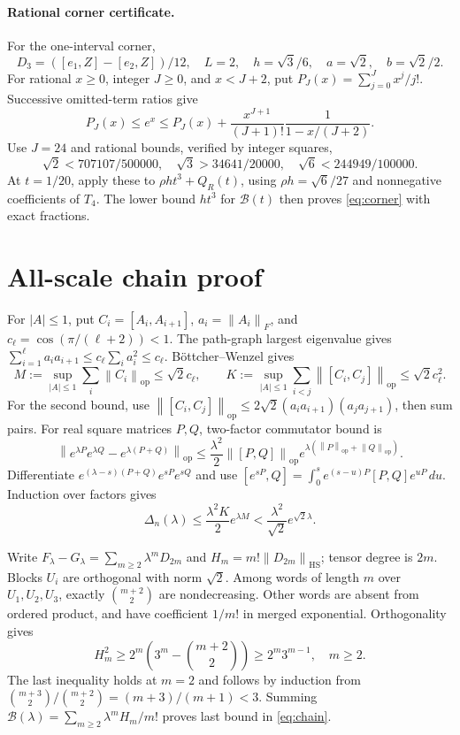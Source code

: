 \documentclass[11pt,a4paper]{article}
\newcommand{\HS}{\mathrm{HS}}
\newcommand{\op}{\mathrm{op}}
\newcommand{\B}{\mathcal B}
\newcommand{\Del}{\Delta}
\newcommand{\norm}[1]{\left\lVert#1\right\rVert}
\begin{document}
\paragraph{Rational corner certificate.}
For the one-interval corner,
\[
 D_3=([e_1,Z]-[e_2,Z])/12,\quad
 L=2,\quad h=\sqrt3/6,\quad a=\sqrt2,\quad b=\sqrt2/2.
\]
For rational \(x\ge0\), integer \(J\ge0\), and \(x<J+2\), put
\(P_J(x)=\sum_{j=0}^Jx^j/j!\). Successive omitted-term ratios give
\[
 P_J(x)\le e^x\le P_J(x)
 +\frac{x^{J+1}}{(J+1)!}\frac1{1-x/(J+2)}.
\]
Use \(J=24\) and rational bounds, verified by integer squares,
\[
 \sqrt2<707107/500000,\quad
 \sqrt3>34641/20000,\quad\sqrt6<244949/100000.
\]
At \(t=1/20\), apply these to \(\rho ht^3+Q_R(t)\), using
\(\rho h=\sqrt6/27\) and nonnegative coefficients of \(T_4\).
The lower bound \(ht^3\) for \(\B(t)\) then proves \eqref{eq:corner}
with exact fractions.

\section{All-scale chain proof}\label{app:chain}
For \(|A|\le1\), put \(C_i=[A_i,A_{i+1}]\),
\(a_i=\norm{A_i}_F\), and \(c_\ell=\cos(\pi/(\ell+2))<1\).
The path-graph largest eigenvalue gives
\(\sum_{i=1}^\ell a_i a_{i+1}\le c_\ell\sum_i a_i^2\le c_\ell\).
B\"ottcher--Wenzel gives
\[
 M:=\sup_{|A|\le1}\sum_i\norm{C_i}_{\op}\le\sqrt2c_\ell,
 \qquad
 K:=\sup_{|A|\le1}\sum_{i<j}\norm{[C_i,C_j]}_{\op}
 \le\sqrt2c_\ell^2.
\]
For the second bound, use
\(\norm{[C_i,C_j]}_{\op}\le2\sqrt2
 (a_i a_{i+1})(a_j a_{j+1})\), then sum pairs.
For real square matrices \(P,Q\), two-factor commutator bound
\cite{iserles2024elementary} is
\[
 \norm{e^{\lambda P}e^{\lambda Q}-e^{\lambda(P+Q)}}_{\op}
 \le\frac{\lambda^2}{2}\norm{[P,Q]}_{\op}
 e^{\lambda(\norm{P}_{\op}+\norm{Q}_{\op})}.
\]
Differentiate \(e^{(\lambda-s)(P+Q)}e^{sP}e^{sQ}\) and use
\([e^{sP},Q]=\int_0^s e^{(s-u)P}[P,Q]e^{uP}\,du\).
Induction over factors gives
\[
 \Del_n(\lambda)\le\frac{\lambda^2K}{2}e^{\lambda M}
 <\frac{\lambda^2}{\sqrt2}e^{\sqrt2\lambda}.
\]

Write \(F_\lambda-G_\lambda=\sum_{m\ge2}\lambda^mD_{2m}\) and
\(H_m=m!\norm{D_{2m}}_{\HS}\); tensor degree is \(2m\).
Blocks \(U_i\) are orthogonal with norm \(\sqrt2\). Among words of length
\(m\) over \(U_1,U_2,U_3\), exactly \(\binom{m+2}{2}\) are nondecreasing.
Other words are absent from ordered product, and have coefficient \(1/m!\)
in merged exponential. Orthogonality gives
\[
 H_m^2\ge2^m\left(3^m-\binom{m+2}{2}\right)\ge2^m3^{m-1},\quad m\ge2.
\]
The last inequality holds at \(m=2\) and follows by induction from
\(\binom{m+3}{2}/\binom{m+2}{2}=(m+3)/(m+1)<3\).
Summing \(\B(\lambda)=\sum_{m\ge2}\lambda^mH_m/m!\) proves last bound
in \eqref{eq:chain}.
\end{document}
